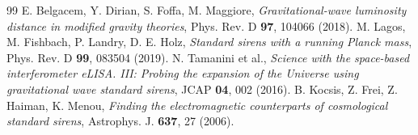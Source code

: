 \documentclass[11pt,a4paper]{article}
\begin{document}
\begin{thebibliography}{99}
 E. Belgacem, Y. Dirian, S. Foffa, M. Maggiore, \textit{Gravitational-wave luminosity distance in modified gravity theories}, Phys. Rev. D \textbf{97}, 104066 (2018).
 M. Lagos, M. Fishbach, P. Landry, D. E. Holz, \textit{Standard sirens with a running Planck mass}, Phys. Rev. D \textbf{99}, 083504 (2019).
 N. Tamanini et al., \textit{Science with the space-based interferometer eLISA. III: Probing the expansion of the Universe using gravitational wave standard sirens}, JCAP \textbf{04}, 002 (2016).
 B. Kocsis, Z. Frei, Z. Haiman, K. Menou, \textit{Finding the electromagnetic counterparts of cosmological standard sirens}, Astrophys. J. \textbf{637}, 27 (2006).
\end{thebibliography}
\end{document}
